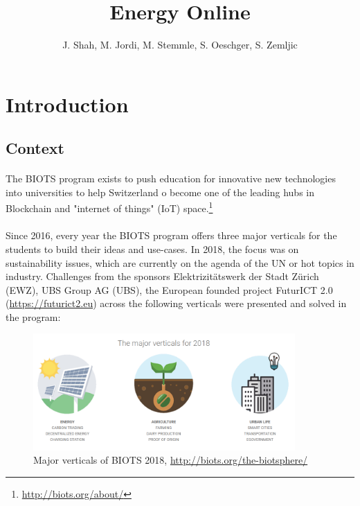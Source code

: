\documentclass{scrartcl}
\begin{document}
	
	\title{Energy Online}
	\subtitle{}
	\author{J. Shah, M. Jordi, M. Stemmle, S. Oeschger, S. Zemljic}
	
	\maketitle
	\newpage
	\tableofcontents
	\newpage
	
	
	\section{Introduction}
	
	\subsection{Context}
	
	\paragraph{}
	 The BIOTS program exists to push education for innovative new technologies into universities to help Switzerland o become one of the leading hubs in Blockchain and "internet of things" (IoT) space.\footnote{\url{http://biots.org/about/}}
	 
	\paragraph{}
	Since 2016, every year the BIOTS program offers three major verticals for the students to build their ideas and use-cases. In 2018, the focus was on sustainability issues, which are currently on the agenda of the UN or hot topics in industry. Challenges from the sponsors Elektrizitätswerk der Stadt Zürich (EWZ), UBS Group AG (UBS), the European founded project FuturICT 2.0 (\url{https://futurict2.eu}) across the following verticals were presented and solved in the program:
	
	\begin{figure} [h]
		\centering
		\includegraphics[width=100mm,scale=0.5]{01_introduction_picture01.PNG}
		\caption{Major verticals of BIOTS 2018, \url{http://biots.org/the-biotsphere/}}
	\end{figure}
\end{document}
